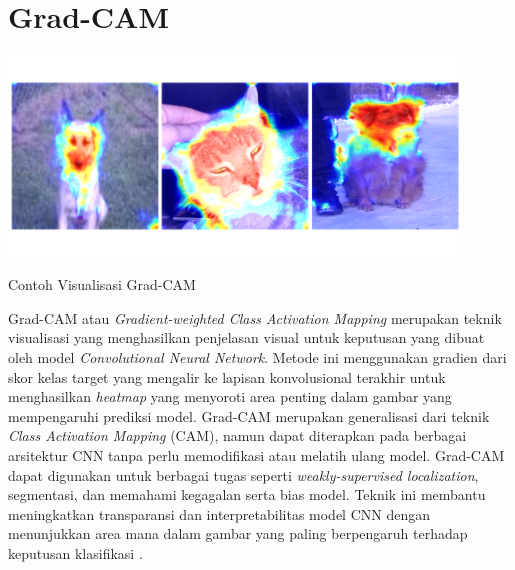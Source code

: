 \section{Grad-CAM}
\begin{afigure}
    \includegraphics[width=0.9\textwidth, center]{images/Picture12.png}
    \caption{Contoh Visualisasi Grad-CAM}
    \label{fig:grad-cam} 
\end{afigure}
Grad-CAM atau \textit{Gradient-weighted Class Activation Mapping} merupakan teknik visualisasi yang menghasilkan penjelasan visual untuk keputusan yang dibuat oleh model \textit{Convolutional Neural Network}. Metode ini menggunakan gradien dari skor kelas target yang mengalir ke lapisan konvolusional terakhir untuk menghasilkan \textit{heatmap} yang menyoroti area penting dalam gambar yang mempengaruhi prediksi model. Grad-CAM merupakan generalisasi dari teknik \textit{Class Activation Mapping} (CAM), namun dapat diterapkan pada berbagai arsitektur CNN tanpa perlu memodifikasi atau melatih ulang model. Grad-CAM dapat digunakan untuk berbagai tugas seperti \textit{weakly-supervised localization}, segmentasi, dan memahami kegagalan serta bias model. Teknik ini membantu meningkatkan transparansi dan interpretabilitas model CNN dengan menunjukkan area mana dalam gambar yang paling berpengaruh terhadap keputusan klasifikasi \cite{selvaraju2017}.

